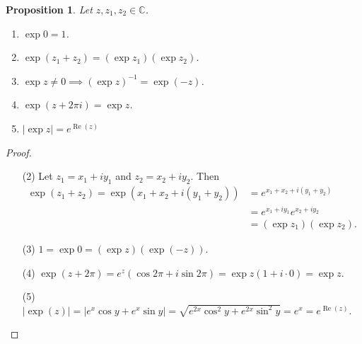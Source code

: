 \documentclass[12pt,openany]{book}
\newtheorem{proposition}[theorem]{Proposition}
\theoremstyle{definition}
\newcommand{\C}{\mathbb{C}}
\newcommand{\of}[1]{\left( #1 \right)}
\newcommand{\abs}[1]{\left\lvert #1 \right\rvert}
\newcommand{\inv}[1]{{#1}^{-1}}
\renewcommand{\Re}{\operatorname{Re}}
\begin{document}
	\begin{tcolorbox}[colback=white,colframe=procolor,arc=5pt,title={\color{white}\bf Properties of Complex Expoenential}]
		\begin{proposition}
			Let $z,z_1,z_2\in\C$. \begin{enumerate}[(1)]
				\item $\exp 0 = 1$.
				\item $\exp\of{z_1+z_2}=(\exp z_1)(\exp z_2)$.
				\item $\exp z\neq 0\implies\inv{\of{\exp z}}=\exp(-z)$.
				\item $\exp(z+2\pi i)=\exp z$.
				\item $\abs{\exp z}=e^{\Re\of{z}}$
			\end{enumerate}
		\end{proposition}
	\end{tcolorbox}
	\begin{proof}
		\begin{itemize}
			\item[(2)] Let $z_1=x_1+iy_1$ and $z_2=x_2+iy_2$. Then \begin{align*}
			\exp\of{z_1+z_2}=\exp\of{x_1+x_2+i(y_1+y_2)}&=e^{x_1+x_2+i(y_1+y_2)}\\
			&=e^{x_1+iy_1}e^{x_2+iy_2}\\
			&=\of{\exp z_1}\of{\exp z_2}.
			\end{align*}
			\item[(3)] $1=\exp 0=\of{\exp z}\of{\exp (-z)}$.
			\item[(4)] $\exp (z+2\pi)=e^z\of{\cos 2\pi+i\sin 2\pi}=\exp z(1+i\cdot 0)=\exp z$.
			\item[(5)] $\abs{\exp\of{z}}=\abs{e^x\cos y+e^x\sin y}=\sqrt{e^{2x}\cos^2y+e^{2x}\sin^2y}=e^x=e^{\Re\of{z}}$.
		\end{itemize}
	\end{proof}
	\newpage
\end{document}
